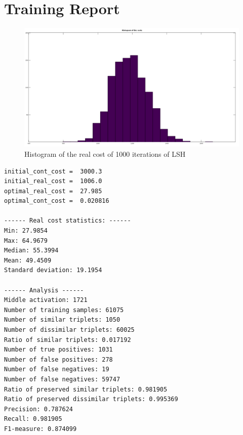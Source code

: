 \chapter{Training Report}

\label{chapter:TrainingReport}


\begin{figure}
	\centering
	\includegraphics[width=\textwidth]{img/lsh_best_of_1000.png}
	\caption{Histogram of the real cost of 1000 iterations of LSH}
	\label{fig:lsh_best_of_1000}
\end{figure}

\begin{lstlisting}
initial_cont_cost =  3000.3
initial_real_cost =  1006.0
optimal_real_cost =  27.985
optimal_cont_cost =  0.020816

------ Real cost statistics: ------
Min: 27.9854
Max: 64.9679
Median: 55.3994
Mean: 49.4509
Standard deviation: 19.1954

------ Analysis ------
Middle activation: 1721
Number of training samples: 61075
Number of similar triplets: 1050
Number of dissimilar triplets: 60025
Ratio of similar triplets: 0.017192
Number of true positives: 1031
Number of false positives: 278
Number of false negatives: 19
Number of false negatives: 59747
Ratio of preserved similar triplets: 0.981905
Ratio of preserved dissimilar triplets: 0.995369
Precision: 0.787624
Recall: 0.981905
F1-measure: 0.874099
\end{lstlisting}
